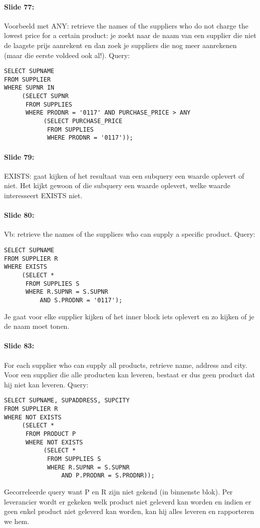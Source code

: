 \documentclass[10pt,a4paper]{report}
\begin{document}
\paragraph{Slide 77:}Voorbeeld met ANY: retrieve the names of the suppliers who do not charge the lowest price for a certain product: je zoekt naar de naam van een supplier die niet de laagste prijs aanrekent en dan zoek je suppliers die nog meer aanrekenen (maar die eerste voldeed ook al!). Query:
\begin{verbatim}
SELECT SUPNAME
FROM SUPPLIER
WHERE SUPNR IN
     (SELECT SUPNR
      FROM SUPPLIES
      WHERE PRODNR = '0117' AND PURCHASE_PRICE > ANY
           (SELECT PURCHASE_PRICE
            FROM SUPPLIES
            WHERE PRODNR = '0117'));
\end{verbatim}

\paragraph{Slide 79:}EXISTS: gaat kijken of het resultaat van een subquery een waarde oplevert of niet. Het kijkt gewoon of die subquery een waarde oplevert, welke waarde interesseert EXISTS niet.

\paragraph{Slide 80:}Vb: retrieve the names of the suppliers who can supply a specific product. Query:
\begin{verbatim}
SELECT SUPNAME
FROM SUPPLIER R
WHERE EXISTS
     (SELECT *
      FROM SUPPLIES S
      WHERE R.SUPNR = S.SUPNR
          AND S.PRODNR = '0117');
\end{verbatim}
Je gaat voor elke supplier kijken of het inner block iets oplevert en zo kijken of je de naam moet tonen.

\paragraph{Slide 83:}For each supplier who can supply all products, retrieve name, address and city. Voor een supplier die alle producten kan leveren, bestaat er dus geen product dat hij niet kan leveren. Query:
\begin{verbatim}
SELECT SUPNAME, SUPADDRESS, SUPCITY
FROM SUPPLIER R
WHERE NOT EXISTS
     (SELECT *
      FROM PRODUCT P
      WHERE NOT EXISTS
           (SELECT *
            FROM SUPPLIES S
            WHERE R.SUPNR = S.SUPNR
                AND P.PRODNR = S.PRODNR));
\end{verbatim}
Gecorreleerde query want P en R zijn niet gekend (in binnenste blok). Per leverancier wordt er gekeken welk product niet geleverd kan worden en indien er geen enkel product niet geleverd kan worden, kan hij alles leveren en rapporteren we hem.
\end{document}
